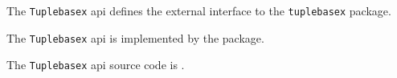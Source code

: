 
The {\tt Tuplebasex} api defines the external interface to the {\tt tuplebasex} package.

The {\tt Tuplebasex} api is implemented by the  package.

The {\tt Tuplebasex} api source code is .


